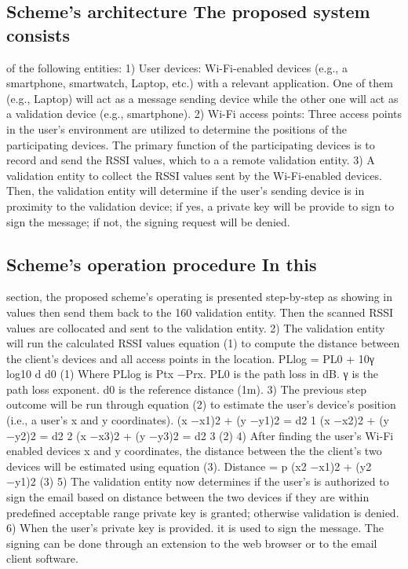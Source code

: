 \documentclass[sigconf]{acmart}
\begin{document}
\subsection{Scheme's architecture The proposed system consists}  of the following entities: 1) User devices: Wi-Fi-enabled devices (e.g., a smartphone, smartwatch, Laptop, etc.) with a relevant application. One of them (e.g., Laptop) will act as a message sending device while the other one will act as a validation device (e.g., smartphone). 2) Wi-Fi access points: Three access points in the user's environment are utilized to determine the positions of the participating devices. The primary function of the participating devices is to record and send the RSSI values, which to a a remote validation entity. 3) A validation entity to collect the RSSI values sent by the Wi-Fi-enabled devices. Then, the validation entity will determine if the user's sending device is in proximity to the validation device; if yes, a private key will be provide to sign to sign the message; if not, the signing request will be denied. \subsection{Scheme's operation procedure In this}  section, the proposed scheme's operating is presented step-by-step as showing in values then send them back to the 160 validation entity. Then the scanned RSSI values are collocated and sent to the validation entity. 2) The validation entity will run the calculated RSSI values equation (1) to compute the distance between the client's devices and all access points in the location. PLlog = PL0 + 10γ log10 d d0 (1) Where PLlog is Ptx −Prx. PL0 is the path loss in dB. γ is the path loss exponent. d0 is the reference distance (1m). 3) The previous step outcome will be run through equation (2) to estimate the user's device's position (i.e., a user's x and y coordinates). (x −x1)2 + (y −y1)2 = d2 1 (x −x2)2 + (y −y2)2 = d2 2 (x −x3)2 + (y −y3)2 = d2 3 (2) 4) After ﬁnding the user's Wi-Fi enabled devices x and y coordinates, the distance between the the client's two devices will be estimated using equation (3). Distance = p (x2 −x1)2 + (y2 −y1)2 (3) 5) The validation entity now determines if the user's is authorized to sign the email based on distance between the two devices if they are within predeﬁned acceptable range private key is granted; otherwise validation is denied. 6) When the user's private key is provided. it is used to sign the message. The signing can be done through an extension to the web browser or to the email client software.
\end{document}

